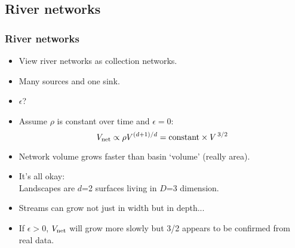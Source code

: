 \subsection{River networks}

\begin{frame}
  \frametitle{River networks}

  \begin{itemize}
  \item<1-> View river networks as collection networks.
  \item<1-> Many sources and one sink.
  \item<2-> $\epsilon$?
  \item<3-> Assume $\rho$ is constant over time and $\epsilon=0$:
    $$V_{\textnormal{net}} \propto \rho V^{(d+1)/d} = \mbox{constant} \times V^{\, 3/2} $$
  \item<4-> Network volume grows faster than
    basin `volume' (really area).
  \item<5-> \alert{It's all okay:}\\ 
    Landscapes are $d$=2 surfaces living in $D$=3 dimension.
  \item<6->
    Streams can grow not just in width but in depth...
  \item<7->
    If $\epsilon > 0$, $V_{\textnormal{net}}$ will grow more slowly
    but 3/2 appears to be confirmed from real data.
  \end{itemize}

\end{frame}

